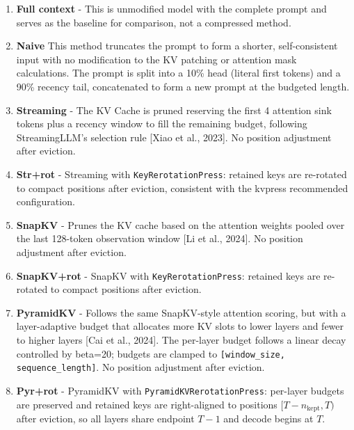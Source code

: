 \documentclass[10pt,letterpaper]{article}
\begin{document}
\begin{enumerate}
\item 
\textbf{Full context} - This is unmodified model with the
complete prompt and serves as the baseline for comparison, not a compressed method.

\item
\textbf{Naive} This method truncates the prompt
to form a shorter, self-consistent input with no modification to the KV patching or
attention mask calculations. The prompt is split into a 10\% head (literal first tokens)
and a 90\% recency tail, concatenated to form a new prompt at the budgeted length.

\item
\textbf{Streaming} - The KV Cache is pruned reserving the first 4 attention sink tokens plus a recency
window to fill the remaining budget, following StreamingLLM’s selection rule [Xiao et al., 2023].
No position adjustment after eviction.

\item
\textbf{Str+rot} - Streaming with \texttt{KeyRerotationPress}: retained keys are re-rotated to
compact positions after eviction, consistent with the kvpress recommended configuration.

\item
\textbf{SnapKV} - Prunes the KV cache based on the attention weights pooled over the last 128-token
observation window {[}Li et al., 2024{]}. No position adjustment after eviction.

\item
\textbf{SnapKV+rot} - SnapKV with \texttt{KeyRerotationPress}: retained keys are re-rotated to
compact positions after eviction.

\item
\textbf{PyramidKV} - Follows the same SnapKV-style attention scoring, but with a layer-adaptive
budget that allocates more KV slots to lower layers and fewer to higher layers [Cai et al., 2024].
The per-layer budget follows a linear decay controlled by beta=20; budgets are clamped to
\texttt{[window\_size, sequence\_length]}. No position adjustment after eviction.

\item
\textbf{Pyr+rot} - PyramidKV with \texttt{PyramidKVRerotationPress}: per-layer budgets are
preserved and retained keys are right-aligned to positions \([T-n_{\text{kept}}, T)\) after
eviction, so all layers share endpoint \(T-1\) and decode begins at \(T\).

\end{enumerate}
\end{document}
